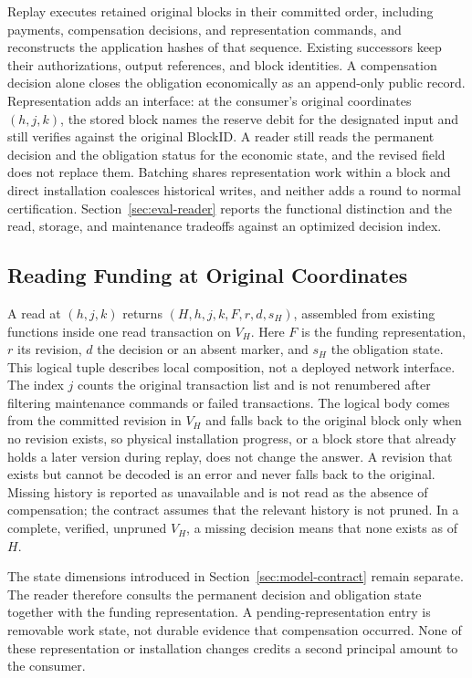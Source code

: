 Replay executes retained original blocks in their committed order, including payments, compensation decisions, and representation commands, and reconstructs the application hashes of that sequence. Existing successors keep their authorizations, output references, and block identities. A compensation decision alone closes the obligation economically as an append-only public record. Representation adds an interface: at the consumer's original coordinates $(h,j,k)$, the stored block names the reserve debit for the designated input and still verifies against the original BlockID. A reader still reads the permanent decision and the obligation status for the economic state, and the revised field does not replace them. Batching shares representation work within a block and direct installation coalesces historical writes, and neither adds a round to normal certification. Section~\ref{sec:eval-reader} reports the functional distinction and the read, storage, and maintenance tradeoffs against an optimized decision index.

\subsection{Reading Funding at Original Coordinates}
\label{sec:protocol-reader}

A read at $(h,j,k)$ returns $(H,h,j,k,F,r,d,s_H)$, assembled from existing functions inside one read transaction on $V_H$. Here $F$ is the funding representation, $r$ its revision, $d$ the decision or an absent marker, and $s_H$ the obligation state. This logical tuple describes local composition, not a deployed network interface. The index $j$ counts the original transaction list and is not renumbered after filtering maintenance commands or failed transactions. The logical body comes from the committed revision in $V_H$ and falls back to the original block only when no revision exists, so physical installation progress, or a block store that already holds a later version during replay, does not change the answer. A revision that exists but cannot be decoded is an error and never falls back to the original. Missing history is reported as unavailable and is not read as the absence of compensation; the contract assumes that the relevant history is not pruned. In a complete, verified, unpruned $V_H$, a missing decision means that none exists as of $H$.



The state dimensions introduced in Section~\ref{sec:model-contract} remain separate.
The reader therefore consults the permanent decision and obligation
state together with the funding representation. A pending-representation
entry is removable work state, not durable evidence that compensation
occurred. None of these representation or installation changes credits
a second principal amount to the consumer.

